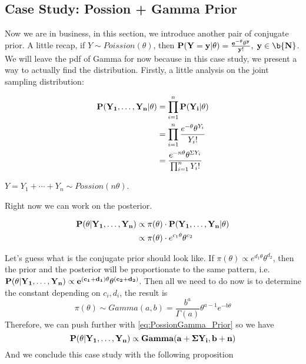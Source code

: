 \subsection{Case Study: Possion + Gamma Prior}
Now we are in business, in this section, we introduce another pair of conjugate prior. A little recap, if $Y \sim Poission(\theta)$, then $\bf{P}(Y=y | \theta) = \frac{e^{-\theta}\theta^y}{y!}, \; y \in \b{N}$. We will leave the pdf of Gamma for now because in this case study, we present a way to actually find the distribution. Firstly, a little analysis on the joint sampling distribution:

\begin{align*}
    \bf{P}(Y_1, \ldots, Y_n | \theta)  &= \prod_{i=1}^{n}\bf{P}(Y_i | \theta) \\
    &= \prod_{i=1}^{n}\frac{e^{-\theta}\theta^{Y_i}}{Y_i!} \\
    &= \frac{e^{-n\theta}\theta^{\Sigma Y_i}}{\prod_{i=1}^{n} Y_i!}
\end{align*}

\begin{note}
    $Y = Y_1 + \cdots + Y_n \sim Possion(n\theta)$.
\end{note}

Right now we can work on the posterior.

\begin{align}
    \bf{P}(\theta | Y_1, \ldots, Y_n) &\propto \pi(\theta) \cdot \bf{P}(Y_1, \ldots, Y_n | \theta) \\
    &\propto \pi(\theta) \cdot e^{c_1\theta}\theta^{c_2} \label{eq:PossionGamma_Prior}
\end{align}

Let's guess what is the conjugate prior should look like. If $\pi(\theta) \propto e^{d_1\theta}\theta^{d_2}$, then the prior and the posterior will be proportionate to the same pattern, i.e. $\bf{P}(\theta | Y_1, \ldots, Y_n) \propto e^{(c_1 + d_1)\theta}\theta^{(c_2 + d_2)}$. Then all we need to do now is to determine the constant depending on $c_i, d_i$, the result is
\begin{equation*}
    \pi(\theta) \sim Gamma(a,b) = \frac{b^a}{\Gamma(a)}\theta^{a-1}e^{-b\theta}
\end{equation*}
Therefore, we can push further with \ref{eq:PossionGamma_Prior} so we have
\begin{equation*}
    \bf{P}(\theta | Y_1, \ldots, Y_n) \propto Gamma(a + \Sigma Y_i, b+n)
\end{equation*}
And we conclude this case study with the following proposition

